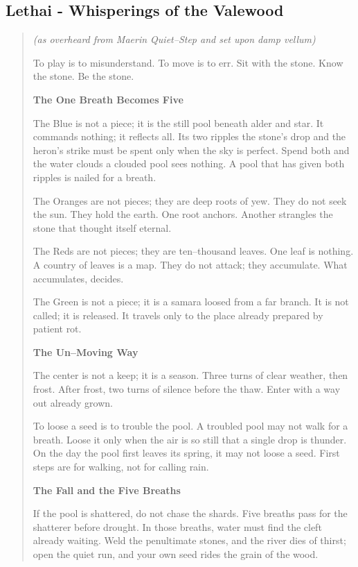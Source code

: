 \documentclass[11pt]{article}
\begin{document}
\subsection{Lethai - Whisperings of the Valewood}
\begin{quote}\small\itshape
(as overheard from Maerin Quiet--Step and set upon damp vellum)

To play is to misunderstand. To move is to err. Sit with the stone. Know the stone. Be the stone.

\medskip
\textbf{The One Breath Becomes Five}

The Blue is not a piece; it is the still pool beneath alder and star. It commands nothing; it reflects all. Its two ripples\; the stone's drop and the heron's strike\; must be spent only when the sky is perfect. Spend both and the water clouds\; a clouded pool sees nothing. A pool that has given both ripples is nailed for a breath.

The Oranges are not pieces; they are deep roots of yew. They do not seek the sun. They hold the earth. One root anchors. Another strangles the stone that thought itself eternal.

The Reds are not pieces; they are ten--thousand leaves. One leaf is nothing. A country of leaves is a map. They do not attack; they accumulate. What accumulates, decides.

The Green is not a piece; it is a samara loosed from a far branch. It is not called; it is released. It travels only to the place already prepared by patient rot.

\medskip
\textbf{The Un--Moving Way}

The center is not a keep; it is a season. Three turns of clear weather, then frost. After frost, two turns of silence before the thaw. Enter with a way out already grown.

To loose a seed is to trouble the pool. A troubled pool may not walk for a breath. Loose it only when the air is so still that a single drop is thunder. On the day the pool first leaves its spring, it may not loose a seed. First steps are for walking, not for calling rain.

\medskip
\textbf{The Fall and the Five Breaths}

If the pool is shattered, do not chase the shards. Five breaths pass for the shatterer before drought. In those breaths, water must find the cleft already waiting. Weld the penultimate stones, and the river dies of thirst; open the quiet run, and your own seed rides the grain of the wood.


\end{quote}
\end{document}
